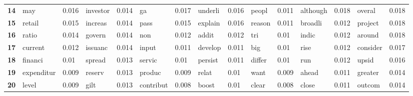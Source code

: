 \begin{tabular}{|l|l|l|l|l|l|}
\textbf{14} &  may &  0.016 &  investor &  0.014 &  ga &  0.017 &  underli &  0.016 &  peopl &  0.011 &  although &  0.018 &  overal &  0.018 \\
\textbf{15} &  retail &  0.015 &  increas &  0.014 &  pass &  0.015 &  explain &  0.016 &  reason &  0.011 &  broadli &  0.012 &  project &  0.018 \\
\textbf{16} &  ratio &  0.014 &  govern &  0.014 &  non &  0.012 &  addit &  0.012 &  tri &  0.01 &  indic &  0.012 &  around &  0.018 \\
\textbf{17} &  current &  0.012 &  issuanc &  0.014 &  input &  0.011 &  develop &  0.011 &  big &  0.01 &  rise &  0.012 &  consider &  0.017 \\
\textbf{18} &  financi &  0.01 &  spread &  0.013 &  servic &  0.01 &  persist &  0.011 &  differ &  0.01 &  run &  0.012 &  upsid &  0.016 \\
\textbf{19} &  expenditur &  0.009 &  reserv &  0.013 &  produc &  0.009 &  relat &  0.01 &  want &  0.009 &  ahead &  0.011 &  greater &  0.014 \\
\textbf{20} &  level &  0.009 &  gilt &  0.013 &  contribut &  0.008 &  boost &  0.01 &  clear &  0.008 &  close &  0.011 &  outcom &  0.014 \\
\bottomrule
\end{tabular}
